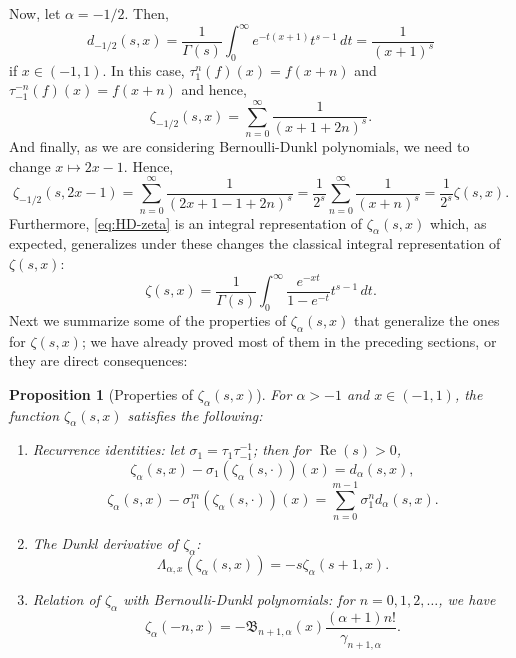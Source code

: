 \documentclass[a4paper]{amsart}
\newcommand{\B}{\mathfrak{B}}
\renewcommand{\Re}{\operatorname{Re}}
\theoremstyle{plain}
\newtheorem{proposition}[theorem]{Proposition}
\theoremstyle{definition}
\theoremstyle{remark}
\numberwithin{equation}{section}
\begin{document}
Now, let $\alpha=-1/2$. Then,
\[
d_{-1/2}(s,x) = \frac{1}{\Gamma(s)} \int_{0}^{\infty} e^{-t(x+1)}t^{s-1} \,dt 
= \frac{1}{(x+1)^{s}}
\]
if $x \in (-1,1)$. In this case, $\tau_{1}^n(f)(x) = f(x+n)$ and $\tau_{-1}^{-n}(f)(x) = f(x+n)$ and hence, 
\[
\zeta_{-1/2}(s,x) = \sum_{n=0}^{\infty} \frac{1}{(x+1+2n)^{s}}.
\]
And finally, as we are considering Bernoulli-Dunkl polynomials, we need to change $x \mapsto 2x - 1$. Hence,
\[
\zeta_{-1/2}(s,2x-1) = \sum_{n=0}^{\infty} \frac{1}{(2x+1-1+2n)^{s}} =
\frac{1}{2^s}
\sum_{n=0}^{\infty} \frac{1}{(x+n)^{s}} =  \frac{1}{2^s}\zeta(s,x).
\]
Furthermore, \eqref{eq:HD-zeta} is an integral representation of $\zeta_\alpha(s,x)$ which, as expected, generalizes under these changes the classical integral representation of~$\zeta(s,x)$:
\begin{equation*}
\zeta(s,x) = \frac{1}{\Gamma(s)}\int_{0}^{\infty} \frac{e^{-xt}}{1-e^{-t}}t^{s-1}\,dt.
\end{equation*} 
Next we summarize some of the properties of $\zeta_\alpha(s,x)$ that generalize the ones for $\zeta(s,x)$; we have already proved most of them in the preceding sections, or they are direct consequences:

\begin{proposition}[Properties of $\zeta_\alpha(s,x)$]
\label{prop:basic-z}
For $\alpha>-1$ and $x \in (-1,1)$, the function $\zeta_\alpha(s,x)$ satisfies the following:
\begin{enumerate}
\item Recurrence identities: let $\sigma_1 = \tau_1 \tau_{-1}^{-1}$; then for $\Re(s)>0$,
\begin{equation}
\label{eq:rec-HD}
    \zeta_{\alpha}(s,x) - \sigma_1(\zeta_{\alpha}(s,\cdot))(x) = d_{\alpha}(s,x),
\end{equation}
\begin{equation}
\label{eq:rec-m-HD}
    \zeta_{\alpha}(s,x) - \sigma_1^m(\zeta_{\alpha}(s,\cdot))(x) 
    = \sum_{n=0}^{m-1} \sigma_1^{n}d_{\alpha}(s,x).
\end{equation}
\item The Dunkl derivative of $\zeta_{\alpha}$:
\begin{equation}
\label{eq:prop-der-dunkl}
\Lambda_{\alpha,x} (\zeta_{\alpha}(s,x)) = -s \zeta_{\alpha}(s+1,x).
\end{equation}
\item Relation of $\zeta_{\alpha}$ with Bernoulli-Dunkl polynomials:
for $n=0,1,2,\dots$, we have
\begin{equation}
\label{eq:HLD-ber-dunkl}
    \zeta_{\alpha}(-n,x) = -\B_{n+1,\alpha}(x) \frac{(\alpha+1)n!}{\gamma_{n+1,\alpha}}.
\end{equation}
\end{enumerate}
\end{proposition}
\end{document}
